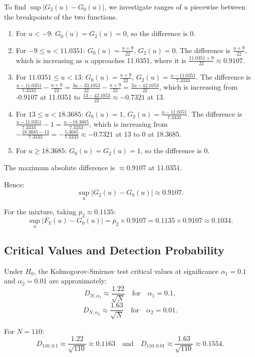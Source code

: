 \documentclass{article}
\begin{document}
To find \(\sup|G_2(u)-G_0(u)|\), we investigate ranges of \(u\) piecewise between the breakpoints of the two functions.

\begin{enumerate}
    \item For \(u < -9\): \(G_0(u) = G_2(u) = 0\), so the difference is 0.
    \item For \(-9 \le u < 11.0351\): \(G_0(u) = \frac{u+9}{22}\), \(G_2(u) = 0\). The difference is \(\frac{u+9}{22}\), which is increasing as \(u\) approaches 11.0351, where it is \(\frac{11.0351 + 9}{22} \approx 0.9107\).
    \item For \(11.0351 \le u < 13\): \(G_0(u) = \frac{u+9}{22}\), \(G_2(u) = \frac{u-11.0351}{7.3333}\). The difference is \(\frac{u-11.0351}{7.3333} - \frac{u+9}{22} = \frac{3u-33.1053}{22} - \frac{u+9}{22} = \frac{2u-42.1053}{22}\), which is increasing from -0.9107 at 11.0351 to \(\frac{13-42.1053}{22} \approx -0.7321\) at 13.
    \item For \(13 \le u < 18.3685\): \(G_0(u) = 1\), \(G_2(u) = \frac{u-11.0351}{7.3333}\). The difference is \(\frac{u-11.0351}{7.3333} - 1 = \frac{u-18.3685}{7.3333}\), which is increasing from \(-\frac{18.3685 - 13}{7.3333} = -\frac{5.3685}{7.3333} \approx -0.7321\) at 13 to 0 at 18.3685.
    \item For \(u \ge 18.3685\): \(G_0(u) = G_2(u) = 1\), so the difference is 0.
\end{enumerate}

The maximum absolute difference is \(\approx 0.9107\) at 11.0351.

Hence:
\[
\sup_u|G_2(u)-G_0(u)| \approx 0.9107.
\]

For the mixture, taking \(p_2 \approx 0.1135\):
\[
\sup_u|F_Y(u)-G_0(u)| = p_2 \times 0.9107 = 0.1135 \times 0.9107 \approx 0.1034.
\]

\subsection{Critical Values and Detection Probability}

Under \(H_0\), the Kolmogorov-Smirnov test critical values at significance \(\alpha_1=0.1\) and \(\alpha_2=0.01\) are approximately:
\[
D_{N,\alpha_1} \approx \frac{1.22}{\sqrt{N}} \quad \text{for} \quad \alpha_1=0.1,
\]
\[
D_{N,\alpha_2} \approx \frac{1.63}{\sqrt{N}} \quad \text{for} \quad \alpha_2=0.01.
\]

For \(N=110\):
\[
D_{110,0.1} \approx \frac{1.22}{\sqrt{110}} \approx 0.1163 \quad \text{and} \quad D_{110,0.01} \approx \frac{1.63}{\sqrt{110}} \approx 0.1554.
\]
\end{document}
